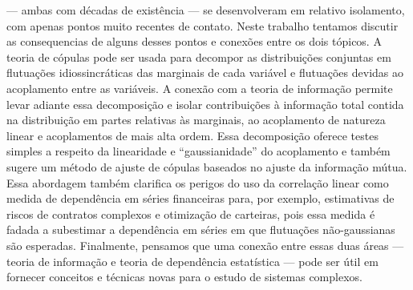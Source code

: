  --- ambas com décadas de existência --- se desenvolveram em relativo isolamento, com apenas pontos muito recentes de contato. Neste trabalho tentamos discutir as consequencias de alguns desses pontos e conexões entre os dois tópicos. A teoria de cópulas pode ser usada para decompor as distribuições conjuntas em flutuações idiossincráticas das marginais de cada variável e flutuações devidas ao acoplamento entre as variáveis. A conexão com a teoria de informação permite levar adiante essa decomposição e isolar contribuições à informação total contida na distribuição em partes relativas às marginais, ao acoplamento de natureza linear e acoplamentos de mais alta ordem. Essa decomposição oferece testes simples a respeito da linearidade e ``gaussianidade'' do acoplamento e também sugere um método de ajuste de cópulas baseados no ajuste da informação mútua. Essa abordagem também clarifica os perigos do uso da correlação linear como medida de dependência em séries financeiras para, por exemplo, estimativas de riscos de contratos complexos e otimização de carteiras, pois essa medida é fadada a subestimar a dependência em séries em que flutuações não-gaussianas são esperadas. Finalmente, pensamos que uma conexão entre essas duas áreas --- teoria de informação e teoria de dependência estatística --- pode ser útil em fornecer conceitos e técnicas novas para o estudo de sistemas complexos. 
